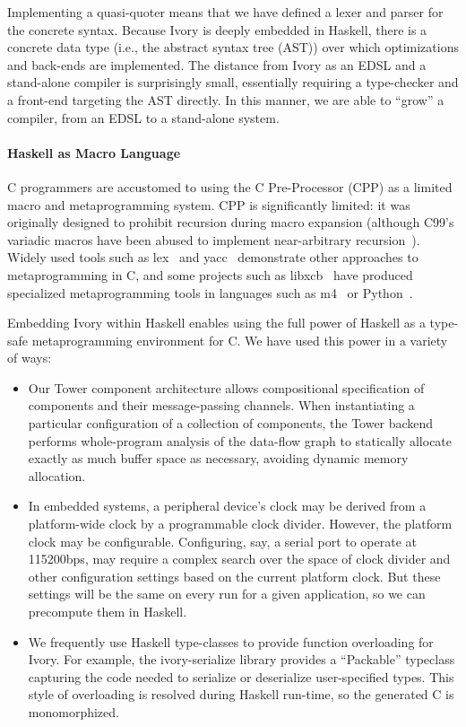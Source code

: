 Implementing a quasi-quoter means that we have defined a lexer and parser for
the concrete syntax. Because Ivory is deeply embedded in Haskell, there is a
concrete data type (i.e., the abstract syntax tree (AST)) over which
optimizations and back-ends are implemented. The distance from Ivory as an EDSL
and a stand-alone compiler is surprisingly small, essentially requiring a
type-checker and a front-end targeting the AST directly. In this manner, we are
able to ``grow'' a compiler, from an EDSL to a stand-alone system.


\paragraph{Haskell as Macro Language}
C programmers are accustomed to using the C Pre-Processor (CPP) as a limited
macro and metaprogramming system. CPP is significantly limited: it was
originally designed to prohibit recursion during macro expansion (although
C99's variadic macros have been abused to implement near-arbitrary
recursion~\cite{cpp-turing}). Widely used tools such as lex~\cite{lex} and
yacc~\cite{yacc} demonstrate other approaches to metaprogramming in C, and some
projects such as libxcb~\cite{xcb} have produced specialized metaprogramming
tools in languages such as m4~\cite{m4} or Python~\cite{python}.

Embedding Ivory within Haskell enables using the full power of Haskell as a
type-safe metaprogramming environment for C. We have used this power in a
variety of ways:

\begin{itemize}
\item Our Tower component architecture allows compositional specification of
  components and their message-passing channels. When instantiating a particular
  configuration of a collection of components, the Tower backend performs
  whole-program analysis of the data-flow graph to statically allocate exactly
  as much buffer space as necessary, avoiding dynamic memory allocation.
\item In embedded systems, a peripheral device's clock may be derived from a
  platform-wide clock by a programmable clock divider. However, the platform
  clock may be configurable. Configuring, say, a serial port to operate at
  115200bps, may require a complex search over the space of clock divider and
  other configuration settings based on the current platform clock. But these
  settings will be the same on every run for a given application, so we can
  precompute them in Haskell.
\item We frequently use Haskell type-classes to provide function overloading for
  Ivory. For example, the ivory-serialize library provides a ``Packable''
  typeclass capturing the code needed to serialize or deserialize user-specified
  types. This style of overloading is resolved during Haskell run-time, so the
  generated C is monomorphized.
\end{itemize}

